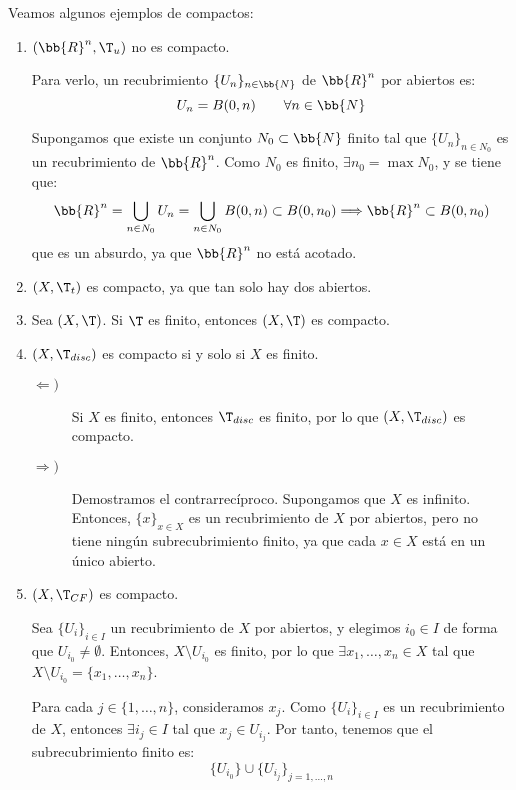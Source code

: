 \begin{ejemplo}
    Veamos algunos ejemplos de compactos:
    \begin{enumerate}
        \item $(\bb{R}^n,\T_u)$ no es compacto.
        
        Para verlo, un recubrimiento $\{U_n\}_{n\in \bb{N}}$ de $\bb{R}^n$ por abiertos es:
        \begin{equation*}
            U_n = B(0, n)  \qquad \forall n\in \bb{N}
        \end{equation*}

        Supongamos que existe un conjunto $N_0\subset \bb{N}$ finito tal que $\{U_n\}_{n\in N_0}$ es un recubrimiento de $\bb{R}^n$.
        Como $N_0$ es finito, $\exists n_0=\max N_0$, y se tiene que:
        \begin{equation*}
            \bb{R}^n= \bigcup_{n\in N_0}U_n = \bigcup_{n\in N_0}B(0,n) \subset B(0,n_0) \Longrightarrow \bb{R}^n \subset B(0,n_0)
        \end{equation*}
        que es un absurdo, ya que $\bb{R}^n$ no está acotado.

        \item $(X,\T_t)$ es compacto, ya que tan solo hay dos abiertos.
        
        \item Sea $(X,\T)$. Si $\T$ es finito, entonces $(X,\T)$ es compacto.
        
        \item $(X,\T_{disc})$ es compacto si y solo si $X$ es finito.
        \begin{description}
            \item[$\Longleftarrow)$] Si $X$ es finito, entonces $\T_{disc}$ es finito, por lo que $(X,\T_{disc})$ es compacto.
            \item[$\Longrightarrow)$] Demostramos el contrarrecíproco. Supongamos que $X$ es infinito. Entonces, $\{x\}_{x\in X}$ es un recubrimiento de $X$ por abiertos,
            pero no tiene ningún subrecubrimiento finito, ya que cada $x\in X$ está en un único abierto.
        \end{description}

        \item $(X,\T_{CF})$ es compacto.
        
        Sea $\{U_i\}_{i\in I}$ un recubrimiento de $X$ por abiertos, y elegimos $i_0\in I$ de forma que $U_{i_0}\neq \emptyset$.
        Entonces, $X\setminus U_{i_0}$ es finito, por lo que $\exists x_1,\dots,x_n\in X$ tal que $X\setminus U_{i_0}=\{x_1,\dots,x_n\}$.

        Para cada $j\in \{1,\dots,n\}$, consideramos $x_j$. Como $\{U_i\}_{i\in I}$ es un recubrimiento de $X$, entonces $\exists i_j\in I$ tal que $x_j\in U_{i_j}$.
        Por tanto, tenemos que el subrecubrimiento finito es:
        \begin{equation*}
            \{U_{i_0}\} \cup \{U_{i_j}\}_{j=1,\dots,n}
        \end{equation*}
    \end{enumerate}
\end{ejemplo}

